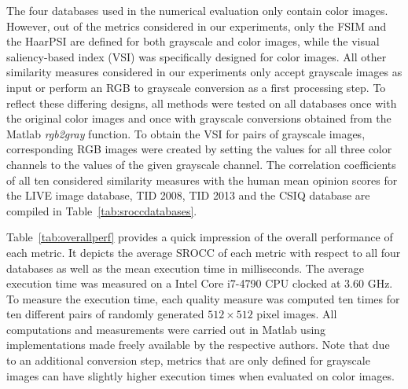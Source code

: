 \documentclass[11pt,a4paper]{article}
\begin{document}
The four databases used in the numerical evaluation only contain color images. However, out of the metrics considered in our experiments, only the FSIM and the HaarPSI are defined for both grayscale and color images, while the visual saliency-based index (VSI) was specifically designed for color images. All other similarity measures considered in our experiments only accept grayscale images as input or perform an RGB to grayscale conversion as a first processing step. To reflect these differing designs, all methods were tested on all databases once with the original color images and once with grayscale conversions obtained from the Matlab \textit{rgb2gray} function. To obtain the VSI for pairs of grayscale images, corresponding RGB images were created by setting the values for all three color channels to the values of the given grayscale channel. The correlation coefficients of all ten considered similarity measures with the human mean opinion scores for the LIVE image database, TID 2008, TID 2013 and the CSIQ database are compiled in Table~\ref{tab:sroccdatabases}.

Table~\ref{tab:overallperf} provides a quick impression of the overall performance of each metric. It depicts the average SROCC of each metric with respect to all four databases as well as the mean execution time in milliseconds. The average execution time was measured on a Intel Core i7-4790 CPU clocked at $3.60$ GHz. To measure the execution time, each quality measure was computed ten times for ten different pairs of randomly generated $512\times512$ pixel images. All computations and measurements were carried out in Matlab using implementations made freely available by the respective authors. Note that due to an additional conversion step, metrics that are only defined for grayscale images can have slightly higher execution times when evaluated on color images.
\end{document}
